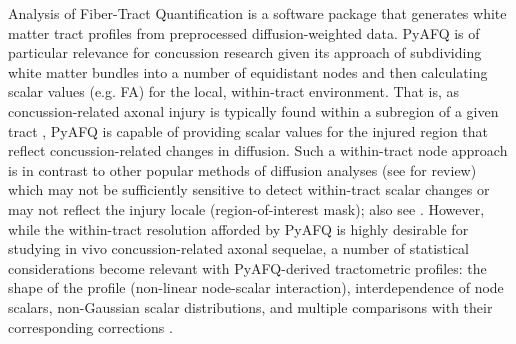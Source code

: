 \documentclass[12pt]{article}
\begin{document}
Analysis of Fiber-Tract Quantification \parencite[PyAFQ;][]{yeatman2012TractProfilesWhite,kruper2021EvaluatingReliabilityHuman,kruper2024TractometryHumanConnectome} is a software package that generates white matter tract profiles from preprocessed diffusion-weighted data. PyAFQ is of particular relevance for concussion research given its approach of subdividing white matter bundles into a number of equidistant nodes and then calculating scalar values (e.g. FA) for the local, within-tract environment. That is, as concussion-related axonal injury is typically found within a subregion of a given tract \parencite[e.g. parasagittal splenium;][]{jang2020DiagnosticProblemsDiffuse,johnson2013AxonalPathologyTraumatic,lindsey2023DiffusionWeightedImagingMild}, PyAFQ is capable of providing scalar values for the injured region that reflect concussion-related changes in diffusion. Such a within-tract node approach is in contrast to other popular methods of diffusion analyses (see \textcite{lindsey2023DiffusionWeightedImagingMild} for review) which may not be sufficiently sensitive to detect within-tract scalar changes \parencite[e.g. whole-tract or skeletal analyses;][]{smith2006TractbasedSpatialStatistics,fischl2012FreeSurfer} or may not reflect the injury locale (region-of-interest mask); also see \textcite{goodrich-hunsaker2018AgeSexrelatedEffects}. However, while the within-tract resolution afforded by PyAFQ is highly desirable for studying in vivo concussion-related axonal sequelae, a number of statistical considerations become relevant with PyAFQ-derived tractometric profiles: the shape of the profile (non-linear node-scalar interaction), interdependence of node scalars, non-Gaussian scalar distributions, and multiple comparisons with their corresponding corrections \parencite{muncy2022GeneralAdditiveModels,richie-halford2021MultidimensionalAnalysisDetection}.
\end{document}
